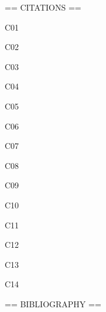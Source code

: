 \documentclass[paper={1500mm,1000mm},line_length=1450mm,number_of_lines=150]{jlreq}
\newcommand*{\case}[2]{#1 #2\par}
\begin{document}
\raggedright
== CITATIONS ==\par
\case{C01}{\parencite{Unsigned1991}}
\case{C02}{\parencite{Unsigned1992}}
\case{C03}{\parencite{UnsignedMag1993}}
\case{C04}{\parencite{UnsignedType1994}}
\case{C05}{\parencite{UnsignedOptions1995}}
\case{C06}{\parencite{UnsignedTypeOptions1996}}
\case{C07}{\parencite{Signed1997}}
\case{C08}{\parencite{EmptyAuthorMag}}
\case{C09}{\parencite{NoAuthorMisc}}
\case{C10}{\parencite{NoAuthorArticle}}
\case{C11}{\parencite{NoAuthorOptions}}
\case{C12}{\parencite{PerA1999}}
\case{C13}{\parencite{PerB1999}}
\case{C14}{\parencite{PerNoEditor}}
\nocite{*}
== BIBLIOGRAPHY ==\par
\printbibliography[heading=none]
\end{document}
